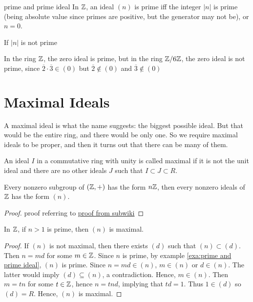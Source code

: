 \begin{example}{}{prime and prime ideal}
    In $\mathbb{Z}$, an ideal $(n)$ is prime iff the integer $|n|$ is prime (being absolute value since primes are positive, but the generator may not be), or $n=0$.
\end{example}

If $|n|$ is  not prime

\begin{example}{}{}
    In the ring $\mathbb{Z}$, the zero ideal is prime, but in the ring $\mathbb{Z}/6\mathbb{Z}$, the zero ideal is not prime, 
    since $\overline{2}\cdot \overline{3}\in (0)$ but $\overline{2}\notin (0)$ and $\overline{3}\notin (0)$ 
\end{example}


\section{Maximal Ideals}
A maximal ideal is what the name suggests: the biggest possible ideal. But that would be the entire
ring, and there would be only one. So we require maximal ideals to be proper, and then it turns out
that there can be many of them.

\begin{definition}{}{}
    An ideal $I$ in a commutative ring with unity is called maximal if it is not the unit ideal and there are no other ideals $J$ such that $I\subset J \subset R$.
\end{definition}

\begin{proposition}{}{}
    Every nonzero subgroup of $(\mathbb{Z}, +)$ has the form $n\mathbb{Z}$, 
    then every nonzero ideals of $\mathbb{Z}$ has the form $(n)$.
\end{proposition}
\begin{proof}
    proof referring to \href{https://proofwiki.org/wiki/Subgroups_of_Additive_Group_of_Integers}{proof from subwiki}
\end{proof}

\begin{proposition}{}{}
    In $\mathbb{Z}$, if $n>1$ is prime, then $(n)$ is maximal.
\end{proposition}
\begin{proof}
    If $(n)$ is not maximal, then there exists $(d)$ such that $(n)\subset (d)$.
    Then $n=md$ for some $m\in\mathbb{Z}$. Since $n$ is prime, by example \ref{exa:prime and prime ideal}, $(n)$ is prime.
    Since $n=md\in (n)$, $m\in (n)$ or $d\in (n)$. The latter would imply $(d)\subseteq (n)$, a contradiction. 
    Hence, $m\in (n)$. Then $m=tn$ for some $t\in\mathbb{Z}$, hence $n=tnd$, implying that $td=1$. Thus $1\in (d)$ so $(d)=R$.
    Hence, $(n)$ is maximal.
\end{proof}
    
